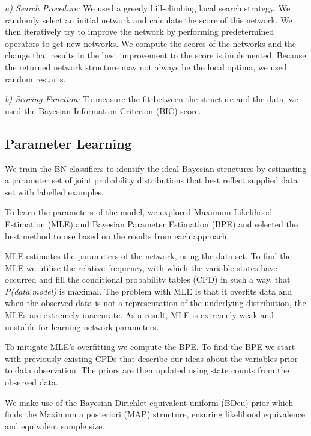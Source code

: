 \documentclass[conference]{IEEEtran}
\begin{document}
\textit{a) Search Procedure:} We used a greedy hill-climbing local search strategy. We randomly select an initial network and calculate the score of this network. We then iteratively try to improve the network by performing predetermined operators to get new networks. We compute the scores of the networks and the change that results in the best improvement to the score is implemented. Because the returned network structure may not always be the local optima, we used random restarts.

\textit{b) Scoring Function:} To measure the fit between the structure and the data, we used the Bayesian Information Criterion (BIC) score.


\subsection{Parameter Learning}
We train the BN classifiers to identify the ideal Bayesian structures by estimating a parameter set of joint probability distributions that best reflect supplied data set with labelled examples.

To learn the parameters of the model, we explored Maximum Likelihood Estimation (MLE) and Bayesian Parameter Estimation (BPE) and selected the best method to use based on the results from each approach. 

MLE estimates the parameters of the network, using the data set. To find the MLE we utilise the relative frequency, with which the variable states have occurred and fill the conditional probability tables (CPD) in such a way, that \textit{P(data$\vert$model)} is maximal. The problem with MLE is that it overfits data and when the observed data is not a representation of the underlying distribution, the MLEs are extremely inaccurate. As a result, MLE is extremely weak and unstable for learning network parameters.

To mitigate MLE's overfitting we compute the BPE. To find the BPE we start with previously existing CPDs that describe our ideas about the variables prior to data observation. The priors are then updated using state counts from the observed data. 

We make use of the Bayesian Dirichlet equivalent uniform (BDeu) prior which finds the Maximum a posteriori (MAP) structure, ensuring likelihood equivalence and equivalent sample size.
\end{document}
